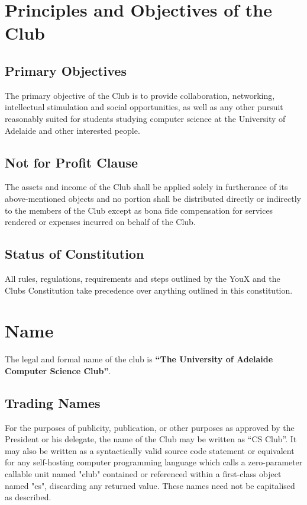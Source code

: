 \documentclass[11pt]{article}
\begin{document}


\tableofcontents

\newpage
\section{Principles and Objectives of the Club} \label{principlesObjectivesClub}
\subsection{Primary Objectives} \label{primaryObjectivesClub}
The primary objective of the Club is to provide collaboration, networking, intellectual stimulation and social opportunities, as well as any other pursuit reasonably suited for students studying computer science at the University of Adelaide and other interested people.

\subsection{Not for Profit Clause} \label{notForProfitClause}
The assets and income of the Club shall be applied solely in furtherance of its above-mentioned objects and no portion shall be distributed directly or indirectly to the members of the Club except as bona fide compensation for services rendered or expenses incurred on behalf of the Club. 

\subsection{Status of Constitution} \label{statusConstitution}
All rules, regulations, requirements and steps outlined by the YouX and the Clubs Constitution take precedence over anything outlined in this constitution.

\section{Name} \label{nameClub}
The legal and formal name of the club is \textbf{“The University of Adelaide Computer Science Club”}.
\subsection{Trading Names}
For the purposes of publicity, publication, or other purposes as approved by the President or his delegate, the name of the Club may be written as “CS Club”. It may also be written as a syntactically valid source code statement or equivalent for any self-hosting computer programming language which calls a zero-parameter callable unit named "club" contained or referenced within a first-class object named "cs", discarding any returned value. These names need not be capitalised as described.
\end{document}
